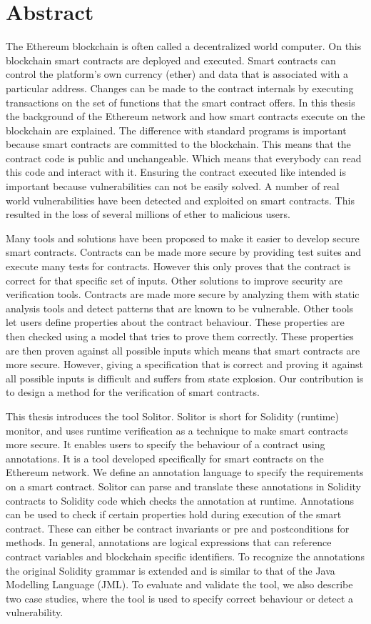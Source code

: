 \documentclass[a4paper]{article}
\begin{document}
\section*{Abstract}
The Ethereum blockchain is often called a decentralized world computer. On this blockchain smart contracts are deployed and executed. Smart contracts can control the platform's own currency (ether) and data that is associated with a particular address. Changes can be made to the contract internals by executing transactions on the set of functions that the smart contract offers. In this thesis the background of the Ethereum network and how smart contracts execute on the blockchain are explained. The difference with standard programs is important because smart contracts are committed to the blockchain. This means that the contract code is public and unchangeable. Which means that everybody can read this code and interact with it. Ensuring the contract executed like intended is important because vulnerabilities can not be easily solved. A number of real world vulnerabilities have been detected and exploited on smart contracts. This resulted in the loss of several millions of ether to malicious users. \par
Many tools and solutions have been proposed to make it easier to develop secure smart contracts. Contracts can be made more secure by providing test suites and execute many tests for contracts. However this only proves that the contract is correct for that specific set of inputs. Other solutions to improve security are verification tools. Contracts are made more secure by analyzing them with static analysis tools and detect patterns that are known to be vulnerable. Other tools let users define properties about the contract behaviour. These properties are then checked using a model that tries to prove them correctly. These properties are then proven against all possible inputs which means that smart contracts are more secure. However, giving a specification that is correct and proving it against all possible inputs is difficult and suffers from state explosion. Our contribution is to design a method for the verification of smart contracts. \par
This thesis introduces the tool Solitor. Solitor is short for Solidity (runtime) monitor, and uses runtime verification as a technique to make smart contracts more secure. It enables users to specify the behaviour of a contract using annotations. It is a tool developed specifically for smart contracts on the Ethereum network. We define an annotation language to specify the requirements on a smart contract. Solitor can parse and translate these annotations in Solidity contracts to Solidity code which checks the annotation at runtime. Annotations can be used to check if certain properties hold during execution of the smart contract. These can either be contract invariants or pre and postconditions for methods. In general, annotations are logical expressions that can reference contract variables and blockchain specific identifiers. To recognize the annotations the original Solidity grammar is extended and is similar to that of the Java Modelling Language (JML). To evaluate and validate the tool, we also describe two case studies, where the tool is used to specify correct behaviour or detect a vulnerability.
\end{document}
